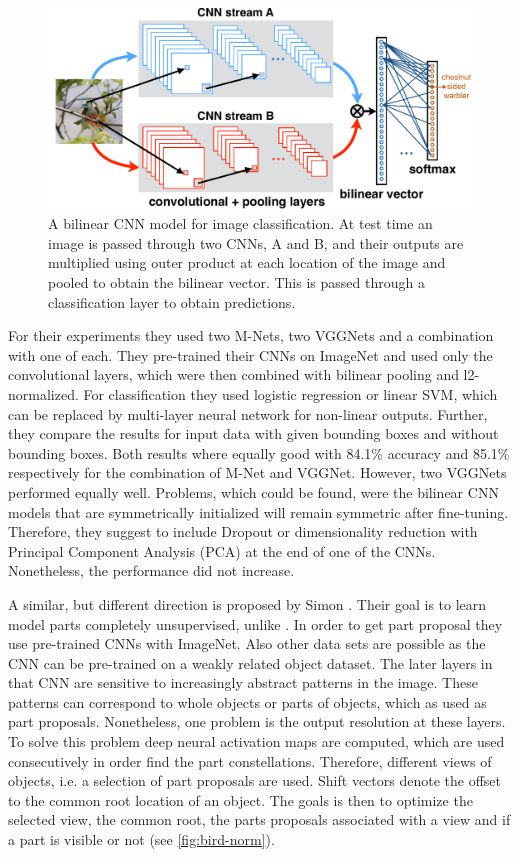 \documentclass[electronic]{vgtc}             %
\begin{document}
	\begin{figure}[htbp]
		\includegraphics[width=.48\textwidth]{bilinear}
		\caption{A bilinear CNN model for image classification. At	test time an image is passed through two CNNs, A and B, and their outputs are multiplied using outer product at each location of the image and pooled to obtain the bilinear vector. This is passed through a classification layer to obtain predictions.\cite{Lin:2015}}
		\label{fig:bilinear}
	\end{figure}
	
	For their experiments they used two M-Nets, two VGGNets and a combination with one of each. 
	They pre-trained their CNNs on ImageNet and used only the convolutional layers, which were then combined with bilinear pooling and l2-normalized.
	For classification they used logistic regression or	linear SVM, which can be replaced by multi-layer neural network for non-linear outputs.
	Further, they compare the results for input data with given bounding boxes and without bounding boxes. 
	Both results where equally good with 84.1\% accuracy and 85.1\% respectively for the combination of M-Net and VGGNet. 
	However, two VGGNets performed equally well.
	Problems, which could be found, were the bilinear CNN models that are symmetrically initialized will remain symmetric after fine-tuning. 
	Therefore, they suggest to include Dropout or dimensionality reduction with Principal Component Analysis (PCA) at the end of one of the CNNs.
	Nonetheless, the performance did not increase. 

	A similar, but different direction is proposed by Simon \cite{Simon:2015}.
	Their goal is to learn model parts completely unsupervised, unlike \cite{Branson:2014}.
	In order to get part proposal they use pre-trained CNNs with ImageNet.
	Also other data sets are possible as the CNN can be pre-trained on a weakly related object dataset.
	The later layers in that CNN are sensitive to increasingly abstract patterns in the image.
	These patterns can correspond to whole objects or parts of objects, which as used as part proposals.
	Nonetheless, one problem is the output resolution at these layers.
	To solve this problem deep neural activation maps are computed, which are used consecutively in order find the part constellations.
	Therefore, different views of objects, i.e. a selection of part proposals are used.
	Shift vectors denote the offset to the common root location of an object.
	The goals is then to optimize the selected view, the common root, the parts proposals associated with a view and if a part is visible or not (see \autoref{fig:bird-norm}).
	
\end{document}
